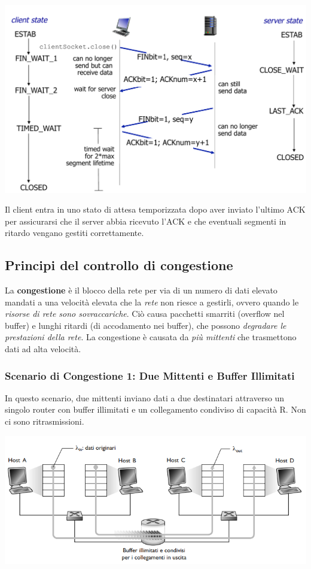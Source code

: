\begin{center}
\includegraphics[width=\textwidth]{./img/chiusuraconnessionetcp.png}
\end{center}
Il client entra in uno stato di attesa temporizzata dopo aver inviato l'ultimo ACK per assicurarsi che il server abbia ricevuto l'ACK e che eventuali segmenti in ritardo vengano gestiti correttamente.

\subsection{Principi del controllo di congestione}
La \textbf{congestione} è il blocco della rete per via di un numero di dati elevato mandati a una velocità elevata che la \textit{rete} non riesce a gestirli, ovvero quando le \textit{risorse di rete sono sovraccariche}.
Ciò causa pacchetti smarriti (overflow nel buffer) e lunghi ritardi (di accodamento nei buffer), che possono \textit{degradare le prestazioni della rete}. La congestione è causata da \textit{più mittenti} che trasmettono dati ad alta velocità.

\subsubsection*{Scenario di Congestione 1: Due Mittenti e Buffer Illimitati}
In questo scenario, due mittenti inviano dati a due destinatari attraverso un singolo router con buffer illimitati e un collegamento condiviso di capacità R. Non ci sono ritrasmissioni.

\begin{center}
  \includegraphics[width=\textwidth]{img/scenario1.png}
\end{center}

